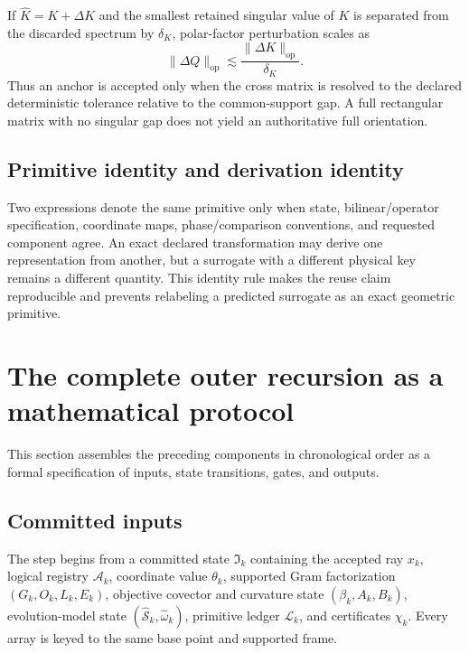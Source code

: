 \documentclass[10pt,twocolumn]{article}
\newcommand{\mathscr}[1]{\mathcal{#1}}
\theoremstyle{definition}
\theoremstyle{remark}
\newcommand{\op}{\mathrm{op}}
\begin{document}
If $\widehat K=K+\Delta K$ and the smallest retained singular value of $K$ is
separated from the discarded spectrum by $\delta_K$, polar-factor
perturbation scales as
\begin{equation}
 \|\Delta Q\|_{\op}
 \lesssim \frac{\|\Delta K\|_{\op}}{\delta_K}.
 \label{eq:apppolarperturb}
\end{equation}
Thus an anchor is accepted only when the cross matrix is resolved to the
declared deterministic tolerance relative to the common-support gap.  A full
rectangular matrix with no singular gap does not yield an authoritative full
orientation.

\subsection{Primitive identity and derivation identity}

Two expressions denote the same primitive only when state,
bilinear/operator specification, coordinate maps, phase/comparison
conventions, and requested component agree.  An exact declared transformation
may derive one representation from another, but a surrogate with a different
physical key remains a different quantity.  This identity rule makes the
reuse claim reproducible and prevents relabeling a predicted surrogate as an
exact geometric primitive.

\section{The complete outer recursion as a mathematical protocol}
\label{app:protocol}

This section assembles the preceding components in chronological order as a
formal specification of inputs, state transitions, gates, and outputs.

\subsection{Committed inputs}

The step begins from a committed state $\mathfrak I_k$ containing the accepted
ray $x_k$, logical registry $\mathcal A_k$, coordinate value $\theta_k$,
supported Gram factorization $(G_k,O_k,L_k,E_k)$, objective covector and
curvature state $(\beta_k,A_k,B_k)$, evolution-model state
$(\widehat{\mathcal S}_k,\widehat\omega_k)$, primitive ledger
$\mathscr L_k$, and certificates $\chi_k$.  Every array is keyed to the same
base point and supported frame.
\end{document}
